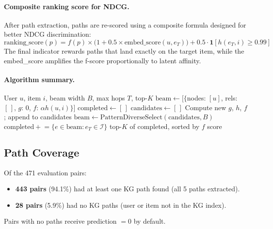 \documentclass[12pt,a4paper]{article}
\begin{document}
\paragraph{Composite ranking score for NDCG.}
After path extraction, paths are re-scored using a composite formula
designed for better NDCG discrimination:
\begin{equation}
  \text{ranking\_score}(p) =
  f(p) \times \bigl(1 + 0.5 \times \text{embed\_score}(u, e_T)\bigr)
  + 0.5 \cdot \mathbf{1}[h(e_T, i) \geq 0.99]
  \label{eq:composite}
\end{equation}
The final indicator rewards paths that land exactly on the target item,
while the embed\_score amplifies the f-score proportionally to latent affinity.

\paragraph{Algorithm summary.}

\begin{algorithm}[H]
\caption{Beam + A* Path Extraction}
\label{alg:beam}
\begin{algorithmic}[1]
\Require User $u$, item $i$, beam width $B$, max hops $T$, top-$K$
\State $\text{beam} \leftarrow [\{$nodes: $[u]$, rels: $[\,]$, $g$: 0, $f$: $\alpha h(u,i)\}]$
\State $\text{completed} \leftarrow [\,]$
  \State $\text{candidates} \leftarrow [\,]$
      \State Compute new $g$, $h$, $f$; append to candidates
    \EndFor
  \EndFor
  \State $\text{beam} \leftarrow \text{PatternDiverseSelect}(\text{candidates}, B)$
  \State $\text{completed} \mathrel{+}= \{e \in \text{beam} : e_T \in \mathcal{I}\}$
\EndFor
\State \Return top-$K$ of completed, sorted by $f$ score
\end{algorithmic}
\end{algorithm}

\subsection{Path Coverage}

Of the 471 evaluation pairs:
\begin{itemize}[leftmargin=2em]
  \item \textbf{443 pairs} (94.1\%) had at least one KG path found (all 5 paths extracted).
  \item \textbf{28 pairs} (5.9\%) had no KG paths (user or item not in the KG index).
\end{itemize}
Pairs with no paths receive prediction $= 0$ by default.
\end{document}
